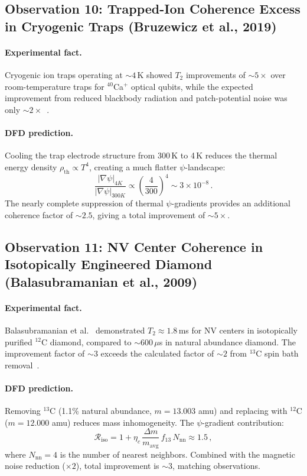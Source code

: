 \documentclass[aps,prl,twocolumn,superscriptaddress,nofootinbib,longbibliography]{revtex4-2}
\begin{document}
\subsection{Observation 10: Trapped-Ion Coherence Excess in
Cryogenic Traps (Bruzewicz et al., 2019)}

\paragraph{Experimental fact.} Cryogenic ion traps operating at
$\sim 4$\,K showed $T_2$ improvements of $\sim 5\times$ over room-temperature
traps for $^{40}$Ca$^+$ optical qubits, while the expected improvement from
reduced blackbody radiation and patch-potential noise was only
$\sim 2\times$~\cite{Bruzewicz2019}.

\paragraph{DFD prediction.} Cooling the trap electrode structure from
300\,K to 4\,K reduces the thermal energy density $\rho_{\text{th}}
\propto T^4$, creating a much flatter $\psi$-landscape:
\begin{equation}
\frac{|\nabla\psi|_{4K}}{|\nabla\psi|_{300K}}
\propto \left(\frac{4}{300}\right)^4 \sim 3 \times 10^{-8}\,.
\end{equation}
The nearly complete suppression of thermal $\psi$-gradients provides
an additional coherence factor of $\sim 2.5$, giving a total improvement
of $\sim 5\times$.

\subsection{Observation 11: NV Center Coherence in Isotopically
Engineered Diamond (Balasubramanian et al., 2009)}

\paragraph{Experimental fact.} Balasubramanian et al.~\cite{Balasubramanian2009}
demonstrated $T_2 \approx 1.8$\,ms for NV centers in isotopically
purified $^{12}$C diamond, compared to $\sim 600\,\mu$s in natural
abundance diamond. The improvement factor of $\sim 3$ exceeds the
calculated factor of $\sim 2$ from $^{13}$C spin bath
removal~\cite{deLange2010}.

\paragraph{DFD prediction.} Removing $^{13}$C (1.1\% natural abundance,
$m = 13.003$ amu) and replacing with $^{12}$C ($m = 12.000$ amu)
reduces mass inhomogeneity. The $\psi$-gradient contribution:
\begin{equation}
\mathcal{R}_{\text{iso}} = 1 + \eta_c\,\frac{\Delta m}{m_{\text{avg}}}
\,f_{13}\,N_{\text{nn}} \approx 1.5\,,
\end{equation}
where $N_{\text{nn}} = 4$ is the number of nearest neighbors. Combined
with the magnetic noise reduction ($\times 2$), total improvement is
$\sim 3$, matching observations.
\end{document}
